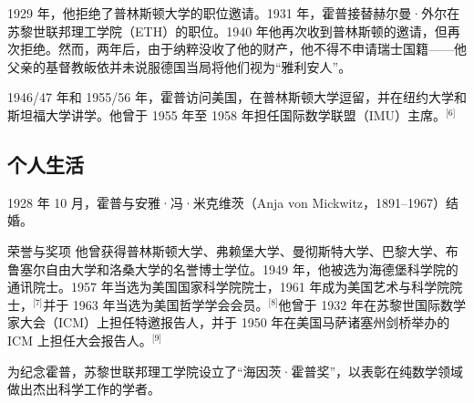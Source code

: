 1929 年，他拒绝了普林斯顿大学的职位邀请。1931 年，霍普接替赫尔曼·外尔在苏黎世联邦理工学院（ETH）的职位。1940 年他再次收到普林斯顿的邀请，但再次拒绝。然而，两年后，由于纳粹没收了他的财产，他不得不申请瑞士国籍——他父亲的基督教皈依并未说服德国当局将他们视为“雅利安人”。

1946/47 年和 1955/56 年，霍普访问美国，在普林斯顿大学逗留，并在纽约大学和斯坦福大学讲学。他曾于 1955 年至 1958 年担任国际数学联盟（IMU）主席。\(^\text{[6]}\)
\subsection{个人生活}
1928 年 10 月，霍普与安雅·冯·米克维茨（Anja von Mickwitz，1891–1967）结婚。

荣誉与奖项
他曾获得普林斯顿大学、弗赖堡大学、曼彻斯特大学、巴黎大学、布鲁塞尔自由大学和洛桑大学的名誉博士学位。1949 年，他被选为海德堡科学院的通讯院士。1957 年当选为美国国家科学院院士，1961 年成为美国艺术与科学院院士，\(^\text{[7]}\)并于 1963 年当选为美国哲学学会会员。\(^\text{[8]}\)他曾于 1932 年在苏黎世国际数学家大会（ICM）上担任特邀报告人，并于 1950 年在美国马萨诸塞州剑桥举办的 ICM 上担任大会报告人。\(^\text{[9]}\)

为纪念霍普，苏黎世联邦理工学院设立了“海因茨·霍普奖”，以表彰在纯数学领域做出杰出科学工作的学者。
